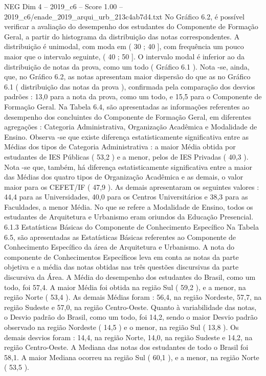 \begin{textsample}{NEG Dim 4 – 2019\_c6 – Score 1.00 – 2019\_c6/enade\_2019\_arqui\_urb\_213c4ab7d4.txt}
No Gráfico 6.2, é possível verificar a avaliação do desempenho dos estudantes do Componente de Formação Geral, a partir do histograma da distribuição das notas correspondentes.
A distribuição é unimodal, com moda em ( 30 ; 40 ], com frequência um pouco maior que o intervalo seguinte, ( 40 ; 50 ].
O intervalo modal é inferior ao da distribuição de notas da prova, como um todo ( Gráfico 6.1 ).
Nota -se, ainda, que, no Gráfico 6.2, as notas apresentam maior dispersão do que as no Gráfico 6.1 ( distribuição das notas da prova ), confirmada pela comparação dos desvios padrões : 13,0 para a nota da prova, como um todo, e 15,5 para o Componente de Formação Geral.
Na Tabela 6.4, são apresentadas as informações referentes ao desempenho dos concluintes do Componente de Formação Geral, em diferentes agregações : Categoria Administrativa, Organização Acadêmica e Modalidade de Ensino.
Observa -se que existe diferença estatisticamente significativa entre as Médias dos tipos de Categoria Administrativa : a maior Média obtida por estudantes de IES Públicas ( 53,2 ) e a menor, pelos de IES Privadas ( 40,3 ).
Nota -se que, também, há diferença estatisticamente significativa entre a maior das Médias dos quatro tipos de Organização Acadêmica e as demais, o valor maior para os CEFET/IF ( 47,9 ).
As demais apresentaram os seguintes valores : 44,4 para as Universidades, 40,0 para os Centros Universitários e 38,3 para as Faculdades, a menor Média.
No que se refere a Modalidade de Ensino, todos os estudantes de Arquitetura e Urbanismo eram oriundos da Educação Presencial. 6.1.3 Estatísticas Básicas do Componente de Conhecimento Específico Na Tabela 6.5, são apresentadas as Estatísticas Básicas referentes ao Componente de Conhecimento Específico da área de Arquitetura e Urbanismo.
A nota do componente de Conhecimentos Específicos leva em conta as notas da parte objetiva e a média das notas obtidas nas três questões discursivas da parte discursiva da Área.
A Média do desempenho dos estudantes do Brasil, como um todo, foi 57,4.
A maior Média foi obtida na região Sul ( 59,2 ), e a menor, na região Norte ( 53,4 ).
As demais Médias foram : 56,4, na região Nordeste, 57,7, na região Sudeste e 57,0, na região Centro-Oeste.
Quanto à variabilidade das notas, o Desvio padrão do Brasil, como um todo, foi 14,2, sendo o maior Desvio padrão observado na região Nordeste ( 14,5 ) e o menor, na região Sul ( 13,8 ).
Os demais desvios foram : 14,4, na região Norte, 14,0, na região Sudeste e 14,2, na região Centro-Oeste.
A Mediana das notas dos estudantes de todo o Brasil foi 58,1.
A maior Mediana ocorreu na região Sul ( 60,1 ), e a menor, na região Norte ( 53,5 ).

\end{textsample}
